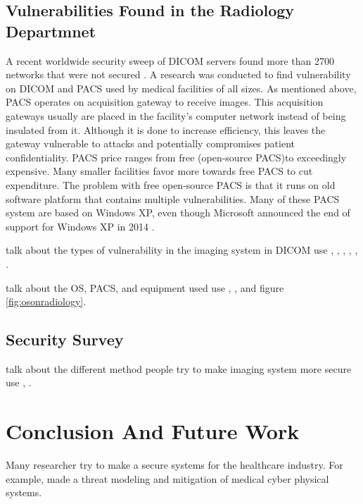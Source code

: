 \documentclass[pdf,bookmarks,colorlinks=true]{IEEEtran}
\begin{document}
\subsection{Vulnerabilities Found in the Radiology Departmnet}
A recent worldwide security sweep of DICOM servers found more than 2700 networks that were not secured \cite{stites2016secure} \cite{ferrara2019cybersecurity}. A research was conducted to find vulnerability on DICOM and PACS used by medical facilities of all sizes. As mentioned above, PACS operates on acquisition gateway to receive images. This acquisition gateways usually are placed in the facility's computer network instead of being insulated from it. Although it is done to increase efficiency, this leaves the gateway vulnerable to attacks and potentially compromises patient confidentiality. PACS price ranges from free (open-source PACS)to exceedingly expensive. Many smaller facilities favor more towards free PACS to cut expenditure. The problem with free open-source PACS is that it runs on old software platform that contains multiple vulnerabilities. Many of these PACS system are based on Windows XP, even though Microsoft announced the end of support for Windows XP in 2014 \cite{ma2019medical}. 

talk about the types of vulnerability in the imaging system in DICOM use \cite{InformationSecurityonDiagnosticImagingSystem}, \cite{stites2016secure}, \cite{mahler2018know}, \cite{ma2019medical}, \cite{ferrara2019cybersecurity}, \cite{stites2016secure}.

talk about the OS, PACS, and equipment used use \cite{moses2015lack}, \cite{fu2014controlling}, and figure \ref{fig:osonradiology}. 

\subsection{Security Survey}
talk about the different method people try to make imaging system more secure
use \cite{Marwan}, \cite{stites2016secure}.

\section{Conclusion And Future Work}
\label{sec:Conclusion}

Many researcher try to make a secure systems for the healthcare industry. For example, \cite{Almohri:2017:TMM:3204094.3204113} made a threat modeling and mitigation of medical cyber physical systems. 





\end{document}
